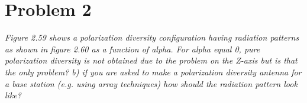 \section{Problem 2}
\textit{Figure 2.59 shows a polarization diversity configuration having radiation patterns as shown in figure 2.60 as a function of alpha. For alpha equal 0, pure polarization diversity is not obtained due to the problem on the Z-axis but is that the only problem? b) if you are asked to make a polarization diversity antenna for a base station (e.g. using array techniques) how should the radiation pattern look like?}

